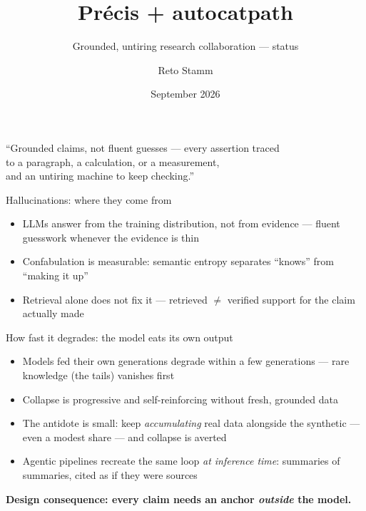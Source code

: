 \documentclass[aspectratio=169,10pt]{beamer}
\title{\texorpdfstring{\textbf{Précis + autocatpath}}{Precis + autocatpath}}
\subtitle{Grounded, untiring research collaboration --- status}
\author{Reto Stamm}
\institute{University of Limerick}
\date{September 2026}
\gdef\SlideCite{}
\newcommand{\citefield}[1]{\gdef\SlideCite{#1}}
\begin{document}
\begin{frame}
  \citefield{}
  \titlepage
  \begin{center}
    \small\textcolor{ULGreenBright}{``Grounded claims, not fluent guesses ---
    every assertion traced\\
    to a paragraph, a calculation, or a measurement,\\
    and an untiring machine to keep checking.''}
  \end{center}
\end{frame}

\begin{frame}{Hallucinations: where they come from}
  \citefield{\href{https://doi.org/10.1038/s41586-024-07421-0}{Farquhar et al., Nature 630, 625--630 (2024)}}
  \begin{itemize}
    \item LLMs answer from the training distribution, not from evidence ---
          fluent guesswork whenever the evidence is thin
    \item Confabulation is measurable: semantic entropy separates
          ``knows'' from ``making it up''
    \item Retrieval alone does not fix it --- retrieved $\neq$ verified support
          for the claim actually made
  \end{itemize}
\end{frame}

\begin{frame}{How fast it degrades: the model eats its own output}
  \citefield{\href{https://doi.org/10.1038/s41586-024-07566-y}{Shumailov et al., Nature 631, 755--759 (2024)} \(\cdot\) \href{https://arxiv.org/abs/2404.01413}{Gerstgrasser et al.\ (2024)}}
  \begin{itemize}
    \item Models fed their own generations degrade within a few
          generations --- rare knowledge (the tails) vanishes first
    \item Collapse is progressive and self-reinforcing without fresh,
          grounded data
    \item The antidote is small: keep \emph{accumulating} real data
          alongside the synthetic --- even a modest share --- and collapse
          is averted
    \item Agentic pipelines recreate the same loop \emph{at inference time}:
          summaries of summaries, cited as if they were sources
  \end{itemize}
  \vfill
  \centering\small\textcolor{ULGreenBright}{\textbf{Design consequence: every claim needs an anchor
  \emph{outside} the model.}}
\end{frame}
\end{document}
